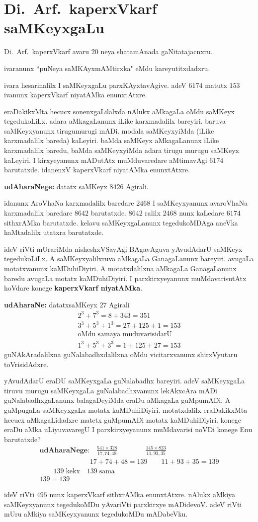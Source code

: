 \chapter{Di.~Arf.\ kaperxVkarf saMKeyxgaLu}

Di.~Arf.\ kaperxVkarf avaru $20$\; neya shatamAnada gaNitatajacnxru.

ivaranunx ``puNeya saMKAyxmAMtirxka" eMdu kareyutitxdadxru.

ivara hesarinalilx I saMKeyxgaLu parxKAyxtavAgive. adeV $6174$ matutx $153$ ivanunx kaperxVkarf niyatAMka enunxtAtxre.

eraDakikxMta hecucx sonenxgaLilalxda nAlukx aMkagaLa oMdu saMKeyx tegedukoLiLx. adara aMkagaLanunx iLike karxmadalilx bareyiri. baruva saMKeyxyanunx tirugumurugi mADi. modala saMKeyxyiMda (iLike karxmadalilx bareda) kaLeyiri. baMda saMKeyx aMkagaLanunx iLike karxmadalilx baredu, baMda saMKeyxyiMda adara tirugu murugu saMKeyx kaLeyiri. I kirxyeyanunx mADutAtx muMduvaredare aMtimavAgi $6174$ barutatxde. idanenxV kaperxVkarf niyatAMka enunxtAtxre.

\textbf{udAharaNege:} datatx saMKeyx $8426$ Agirali.

idanunx AroVhaNa karxmadalilx baredare $2468$ I saMKeyxyanunx avaroVhaNa karxmadalilx baredare $8642$ barutatxde. $8642$\; ralilx $2468$ nunx kaLedare $6174$ sithxrAMka barutatxde. kelavu saMKeyxgaLanunx tegedukoMDAga aneVka haMtadalilx utatxra barutatxde.

ideV riVti mUrariMda nisheshxVSavAgi BAgavAguva yAvudAdarU saMKeyx tegedu\-koLiLx. A saMKeyxyalilxruva aMkagaLa GanagaLanunx bareyiri. avugaLa motatxvanunx kaMDu\-hiDiyiri. A motatxdalilxna aMkagaLa GanagaLanunx baredu avugaLa motatx kaMDu\-hiDiyiri. I parxkirxyeyanunx muMdavarisutAtx hoVdare konege \textbf{ kaperxVkarf niyatAMka}. 

\textbf{udAharaNe:} datatxsaMKeyx $27$ Agirali
\begin{gather*}
2^3+7^3 = 8+343 = 351\\
3^3+5^3+1^3 = 27+125+1 = 153\\
\text{oMdu samaya muduvarisidarU}\\
1^3+5^3+3^3 = 1+125+27 = 153
\end{gather*}
guNAkAradalilxna guNalabadhxdalilxna oMdu vicitarxvanunx shirxVyutaru toVrisidAdxre.

yAvudAdarU eraDU saMKeyxgaLa guNalabadhx bareyiri. adeV saMKeyxgaLa tiruvu murugu saMKeyxgaLa guNalabadhxvanunx lekAkxcAra mADi guNalabadhxgaLanunx balagaDeyiMda eraDu aMkagaLa guMpumADi. A guMpugaLa saMKeyxgaLa motatx kaMDuhiDiyiri. motatxdalilx eraDakikxMta hecucx aMkagaLidadxre matetx guMpumADi motatx kaMDuhiDiyiri. konege eraDu aMka uLiyuvavaregU I parxkirxyeyanunx muMdavarisi noVDi konege Enu barutatxde?
\begin{gather*}
\textbf{udAharaNege:}\quad \frac{541\times 328}{17,74,48} \qquad\qquad \frac{145 \times 823}{11,93,35}\\
\phantom{\text{udAharaNege:}}\quad 17+74+48 = 139 \qquad 11+93+35 = 139\\
\qquad 139\;\text{kekx} \quad 139\; \text{sama}\\
139 = 139
\end{gather*}

ideV riVti $495$ nunx  kaperxVkarf sithxrAMka enunxtAtxre. nAlukx aMkiya saMKeyxyanunx tegedukoMDu yAvariVti parxkirxye mADidevoV. adeV riVti mUru aMkiya saMKeyxyanunx tegedukoMDu mADabeVku.
